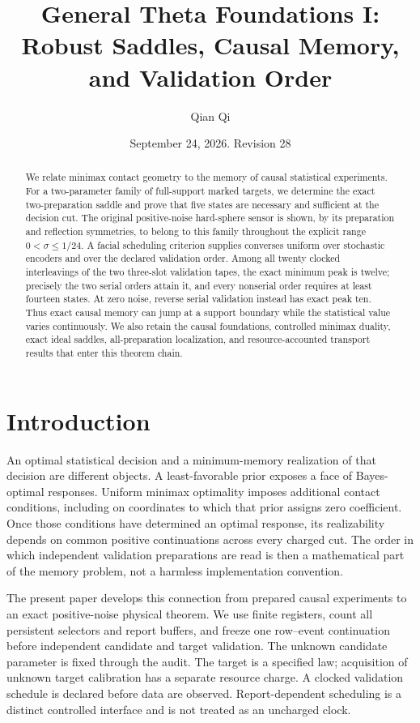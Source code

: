 \documentclass[11pt]{amsart}
\title[Robust saddles and causal memory]{General Theta Foundations I:\\
Robust Saddles, Causal Memory, and Validation Order}
\author{Qian Qi}
\date{September 24, 2026. Revision 28}
\theoremstyle{definition}\newtheorem{definition}[theorem]{Definition}
\theoremstyle{remark}\newtheorem{remark}[theorem]{Remark}
\newcommand{\1}{\mathbf 1}
\begin{document}
\begin{abstract}
We relate minimax contact geometry to the memory of causal statistical
experiments. For a two-parameter family of full-support marked targets,
we determine the exact two-preparation saddle and prove that five states
are necessary and sufficient at the decision cut. The original
positive-noise hard-sphere sensor is shown, by its preparation and
reflection symmetries, to belong to this family throughout the explicit
range $0<\sigma\le1/24$. A facial scheduling criterion supplies converses
uniform over stochastic encoders and over the declared validation order.
Among all twenty clocked interleavings of the two three-slot validation
tapes, the exact minimum peak is twelve; precisely the two serial orders
attain it, and every nonserial order requires at least fourteen states.
At zero noise, reverse serial validation instead has exact peak ten.
Thus exact causal memory can jump at a support boundary while the
statistical value varies continuously. We also retain the causal
foundations, controlled minimax duality, exact ideal saddles,
all-preparation localization, and resource-accounted transport results
that enter this theorem chain.
\end{abstract}
\maketitle
\tableofcontents

\section{Introduction}
An optimal statistical decision and a minimum-memory realization of
that decision are different objects. A least-favorable prior exposes a
face of Bayes-optimal responses. Uniform minimax optimality imposes
additional contact conditions, including on coordinates to which that
prior assigns zero coefficient. Once those conditions have determined
an optimal response, its realizability depends on common positive
continuations across every charged cut. The order in which independent
validation preparations are read is then a mathematical part of the
memory problem, not a harmless implementation convention.

The present paper develops this connection from prepared causal
experiments to an exact positive-noise physical theorem. We use finite
registers, count all persistent selectors and report buffers, and freeze
one row--event continuation before independent candidate and target
validation. The unknown candidate parameter is fixed through the audit.
The target is a specified law; acquisition of unknown target calibration
has a separate resource charge. A clocked validation schedule is declared
before data are observed. Report-dependent scheduling is a distinct
controlled interface and is not treated as an uncharged clock.
\end{document}
